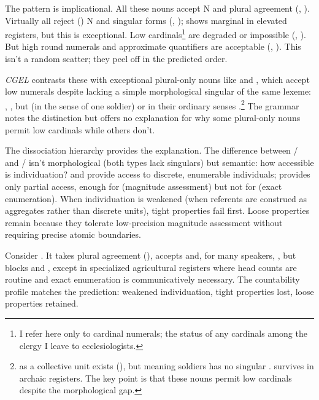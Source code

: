 \documentclass[12pt,a4paper]{article}
\begin{document}
The pattern is implicational. All these nouns accept  N and plural agreement (, ). Virtually all reject () N and singular forms (, );  shows marginal  in elevated registers, but this is exceptional. Low cardinals\footnote{I refer here only to cardinal numerals; the status of any cardinals among the clergy I leave to ecclesiologists.} are degraded or impossible (, ). But high round numerals and approximate quantifiers are acceptable (, ). This isn't a random scatter; they peel off in the predicted order.

\textit{CGEL} contrasts these with exceptional plural-only nouns like  and , which accept low numerals despite lacking a simple morphological singular of the same lexeme: , , but  (in the sense of one soldier) or  in their ordinary senses \citep[p.~345]{huddleston2002}.\footnote{ as a collective unit exists (), but  meaning soldiers has no singular .  survives in archaic registers. The key point is that these nouns permit low cardinals despite the morphological gap.} The grammar notes the distinction but offers no explanation for why some plural-only nouns permit low cardinals while others don't.

The dissociation hierarchy provides the explanation. The difference between / and / isn't morphological (both types lack singulars) but semantic: how accessible is individuation?  and  provide access to discrete, enumerable individuals;  provides only partial access, enough for  (magnitude assessment) but not for  (exact enumeration). When individuation is weakened (when referents are construed as aggregates rather than discrete units), tight properties fail first. Loose properties remain because they tolerate low-precision magnitude assessment without requiring precise atomic boundaries.

Consider . It takes plural agreement (), accepts  and, for many speakers, , but blocks  and , except in specialized agricultural registers where head counts are routine and exact enumeration is communicatively necessary. The countability profile matches the prediction: weakened individuation, tight properties lost, loose properties retained.
\end{document}
